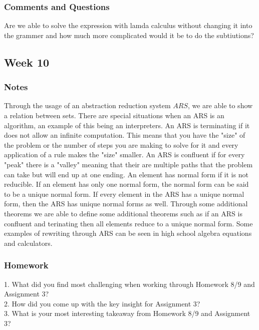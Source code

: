 \documentclass{article}
\theoremstyle{theorem}
\theoremstyle{definition}
\theoremstyle{remark}
\begin{document}
\subsubsection{Comments and Questions}

Are we able to solve the expression with lamda calculus without changing it into the grammer and how much more complicated would it be to do the subtiutions?

\subsection{Week 10}
\subsubsection{Notes}

Through the usage of an abstraction reduction system \(ARS\), we are able to show a relation between sets. 
There are special situations when an ARS is an algorithm, an example of this being an interpreters. 
An ARS is terminating if it does not allow an infinite computation. This means that you have the
"size" of the problem or the number of steps you are making to solve for it and every application 
of a rule makes the "size" smaller. An ARS is confluent if for every "peak" there is a "valley" 
meaning that their are multiple paths that the problem can take but will end up at one ending. An 
element has normal form if it is not reducible. If an element has only one normal form, the normal
form can be said to be a unique normal form. If every element in the ARS has a unique normal form, then 
the ARS has unique normal forms as well.  Through some additional theorems we are able to define some additional 
theorems such as if an ARS is confluent and terinating then all elements reduce to a unique normal form. Some 
examples of rewriting through ARS can be seen in high school algebra equations and calculators.

\subsubsection{Homework}
1. What did you find most challenging when working through Homework 8/9 and Assignment 3?\\
2. How did you come up with the key insight for Assignment 3?\\
3. What is your most interesting takeaway from Homework 8/9 and Assignment 3?\\
\end{document}
